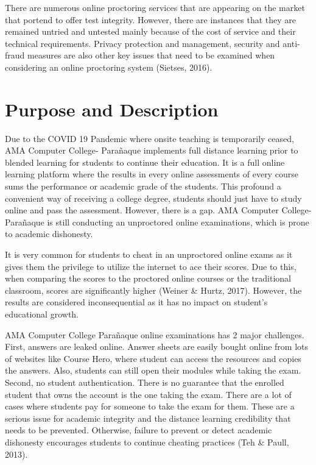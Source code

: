 There are numerous online proctoring services that are appearing on the market that portend to offer test integrity.
However, there are instances that they are remained untried and untested mainly because of the cost of service and their technical requirements.
Privacy protection and management, security and anti-fraud measures are also other key issues that need to be examined when considering an online proctoring system (Sietses, 2016).

\section{Purpose and Description}

Due to the COVID 19 Pandemic where onsite teaching is temporarily ceased, AMA Computer College- Parañaque implements full distance learning prior to blended learning for students to continue their education.
It is a full online learning platform where the results in every online assessments of every course sums the performance or academic grade of the students.
This profound a convenient way of receiving a college degree, students should just have to study online and pass the assessment.
However, there is a gap.
AMA Computer College- Parañaque is still conducting an unproctored online examinations, which is prone to academic dishonesty.

It is very common for students to cheat in an unproctored online exams as it gives them the privilege to utilize the internet to ace their scores.
Due to this, when comparing the scores to the proctored online courses or the traditional classroom, scores are significantly higher (Weiner \& Hurtz, 2017).
However, the results are considered inconsequential as it has no impact on student’s educational growth.

AMA Computer College Parañaque online examinations has 2 major challenges.
First, answers are leaked online.
Answer sheets are easily bought online from lots of websites like Course Hero, where student can access the resources and copies the answers.
Also, students can still open their modules while taking the exam.
Second, no student authentication.
There is no guarantee that the enrolled student that owns the account is the one taking the exam.
There are a lot of cases where students pay for someone to take the exam for them.
These are a serious issue for academic integrity and the distance learning credibility that needs to be prevented.
Otherwise, failure to prevent or detect academic dishonesty encourages students to continue cheating practices (Teh \& Paull, 2013).

